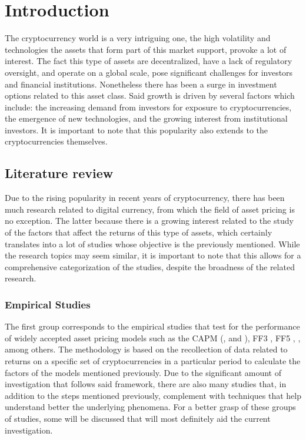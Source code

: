 \chapter{Introduction}
\label{c1} %
The cryptocurrency world is a very intriguing one, the high volatility and technologies the assets that form part of this market support, provoke a lot of interest. The fact this type of assets are decentralized, have a lack of regulatory oversight, and operate on a global scale, pose significant challenges for investors and financial institutions. Nonetheless there has been a surge in investment options related to this asset class. Said growth is driven by several factors which include: the increasing demand from investors for exposure to cryptocurrencies, the emergence of new technologies, and the growing interest from institutional investors. It is important to note that this popularity also extends to the cryptocurrencies themselves.

\section{Literature review}
Due to the rising popularity in recent years of cryptocurrency, there has been much research related to digital currency, from which the field of asset pricing is no exception. The latter because there is a growing interest related to the study of the factors that affect the returns of this type of assets, which certainly translates into a lot of studies whose objective is the previously mentioned. While the research topics may seem similar, it is important to note that this allows for a comprehensive categorization of the studies, despite the broadness of the related research.

\subsection{Empirical Studies}
The first group corresponds to the empirical studies that test for the performance of widely accepted asset pricing models such as the CAPM (\cite{sharpe1964}, \cite{Lintner1965} and \cite{mossin1966equilibrium}), FF3 \parencite{fama1993}, FF5 \parencite{fama2015}, \parencite{carhart1997}, among others. The methodology is based on the recollection of data related to returns on a specific set of cryptocurrencies in a particular period to calculate the factors of the models mentioned previously. Due to the significant amount of investigation that follows said framework, there are also many studies that, in addition to the steps mentioned previously, complement with techniques that help understand better the underlying phenomena. For a better grasp of these groups of studies, some will be discussed that will most definitely aid the current investigation.

